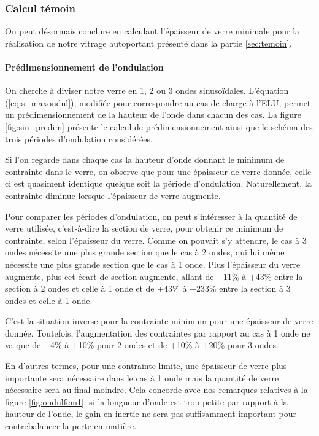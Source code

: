 \documentclass[11pt,titlepage]{article}
\begin{document}
\subsubsection{Calcul témoin}
On peut désormais conclure en calculant l'épaisseur de verre minimale pour la réalisation de notre vitrage autoportant présenté dans la partie \ref{sec:temoin}.

\paragraph{Prédimensionnement de l'ondulation}\mbox{}

On cherche à diviser notre verre en 1, 2 ou 3 ondes sinusoïdales. L'équation (\ref{eq:s_maxondul}), modifiée pour correspondre au cas de charge à l'\acrshort{ELU}, permet un prédimensionnement de la hauteur de l'onde dans chacun des cas. La figure \ref{fig:sin_predim} présente le calcul de prédimensionnement ainsi que le schéma des trois périodes d'ondulation considérées. 

Si l'on regarde dans chaque cas la hauteur d'onde donnant le minimum de contrainte dans le verre, on observe que pour une épaisseur de verre donnée, celle-ci est quasiment identique quelque soit la période d'ondulation. Naturellement, la contrainte diminue lorsque l'épaisseur de verre augmente.

Pour comparer les périodes d'ondulation, on peut s'intéresser à la quantité de verre utilisée, c'est-à-dire la section de verre, pour obtenir ce minimum de contrainte, selon l'épaisseur du verre. Comme on pouvait s'y attendre, le cas à 3 ondes nécessite une plus grande section que le cas à 2 ondes, qui lui même nécessite une plus grande section que le cas à 1 onde. Plus l'épaisseur du verre augmente, plus cet écart de section augmente, allant de +11\% à +43\% entre la section à 2 ondes et celle à 1 onde et de +43\% à +233\% entre la section à 3 ondes et celle à 1 onde.

C'est la situation inverse pour la contrainte minimum pour une épaisseur de verre donnée. Toutefois, l'augmentation des contraintes par rapport au cas à 1 onde ne va que de +4\% à +10\% pour 2 ondes et de +10\% à +20\% pour 3 ondes.

En d'autres termes, pour une contrainte limite, une épaisseur de verre plus importante sera nécessaire dans le cas à 1 onde mais la quantité de verre nécessaire sera au final moindre. Cela concorde avec nos remarques relatives à la figure \ref{fig:ondulfem1}: si la longueur d'onde est trop petite par rapport à la hauteur de l'onde, le gain en inertie ne sera pas suffisamment important pour contrebalancer la perte en matière.
\end{document}
